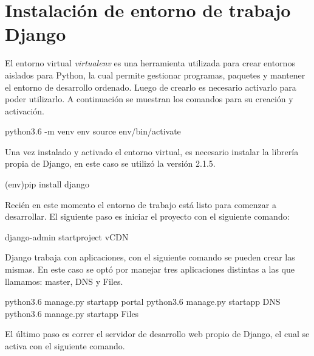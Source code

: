 \documentclass[12pt,a4paper,oneside]{book}
\begin{document}
\section{Instalación de entorno de trabajo Django}
\label{seccA.3}

El entorno virtual \textit{virtualenv} es una herramienta utilizada para crear entornos aislados para Python, la cual permite gestionar programas, paquetes y mantener el entorno de desarrollo ordenado.  Luego de crearlo es necesario activarlo para poder utilizarlo.
A continuación se muestran los comandos para su creación y activación.

\vspace{0.5cm}
\begin{frontend}
 python3.6 -m venv env
 source env/bin/activate
\end{frontend}
\vspace{0.5cm}

Una vez instalado y activado el entorno virtual, es necesario instalar la librería propia de Django, en este caso se utilizó la versión 2.1.5.


\vspace{0.5cm}
\begin{frontend}
(env)pip install django
\end{frontend}
\vspace{0.5cm}

Recién en este momento el entorno de trabajo está listo para comenzar a desarrollar. 
El siguiente paso es iniciar el proyecto con el siguiente comando:


\vspace{0.5cm}
\begin{frontend}
django-admin startproject vCDN
\end{frontend}
\vspace{0.5cm}


Django trabaja con aplicaciones, con el siguiente comando se pueden crear las mismas. En este caso se optó por manejar tres aplicaciones distintas a las que llamamos: master, DNS y Files.

\vspace{0.5cm}
\begin{frontend}
python3.6 manage.py startapp portal
python3.6 manage.py startapp DNS
python3.6 manage.py startapp Files
\end{frontend}
\vspace{0.5cm}

El último paso es correr el servidor de desarrollo web propio de Django, el cual se activa con el siguiente comando.
\end{document}
